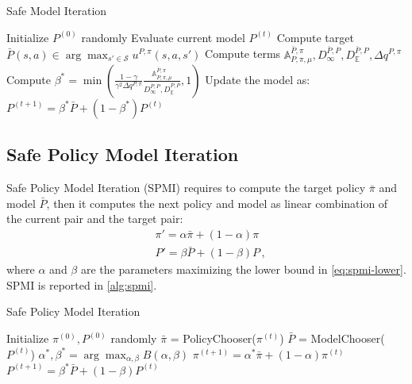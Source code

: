 \begin{algorithm}[tb]
  \caption{Safe Model Iteration
    \label{alg:smi}}
  \begin{algorithmic}[1]
  \State Initialize $P^{(0)}$ randomly
  \State Evaluate current model $P^{(t)}$
  \State Compute target $\bar{P}(s,a) \in \arg \max_{s' \in \mathcal{S}} u^{P,\pi}(s,a,s')$
  \State Compute terms $\mathds{A}_{P, \pi, \mu}^{\bar{P},\pi}, D_\infty^{\bar{P},P}, D_{\mathbb{E}}^{\bar{P}, P}, \Delta q^{P,\pi}$
  \State Compute $\beta^* = \min \left( \frac{1-\gamma}{\gamma^2 \Delta q^{P,\pi}} \frac{\mathds{A}_{P, \pi, \mu}^{\bar{P},\pi}}{D_\infty^{\bar{P},P}, D_{\mathbb{E}}^{\bar{P}, P}}, 1 \right)$ 
   \State Update the model as: $P^{(t+1)} = \beta^* \bar{P} + \left( 1 - \beta^* \right) P^{(t)}$ 
  \EndFor \\
  \end{algorithmic}
\end{algorithm}


\subsection{Safe Policy Model Iteration}
Safe Policy Model Iteration (SPMI) requires to compute the target policy $\bar{\pi}$ and model $\bar{P}$, then it computes the next policy and model as linear combination of the current pair and the target pair:
\begin{align}
	&\pi' = \alpha \bar{\pi} + (1-\alpha) \pi \\
	&P' = \beta \bar{P} + (1-\beta) P \, ,
\end{align}
where $\alpha$ and $\beta$ are the parameters maximizing the lower bound in \ref{eq:spmi-lower}.
SPMI is reported in \cref{alg:spmi}.

\begin{algorithm}[tb]
  \caption{Safe Policy Model Iteration
    \label{alg:spmi}}
  \begin{algorithmic}[1]
  \State Initialize $\pi^{(0)}, P^{(0)}$ randomly
  \State $\bar{\pi}$ = PolicyChooser($\pi^{(t)}$)
  \State $\bar{P}$ = ModelChooser($P^{(t)}$)
  \State $\alpha^*, \beta^* = \arg \max_{\alpha, \beta} B(\alpha, \beta)$ 
  \State $\pi^{(t+1)} = \alpha^* \bar{\pi} + (1 - \alpha)\pi^{(t)}$ 
   \State $P^{(t+1)} = \beta^* \bar{P} + (1 - \beta)P^{(t)}$ 
  \EndFor \\
  \end{algorithmic}
\end{algorithm}

